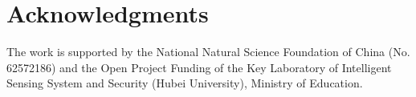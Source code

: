 \documentclass[letterpaper]{article} %
\begin{document}
\section{Acknowledgments}
The work is supported by the National Natural Science Foundation of China (No. 62572186) and the Open Project Funding of the Key Laboratory of Intelligent Sensing System and Security (Hubei University), Ministry of Education.


\end{document}
